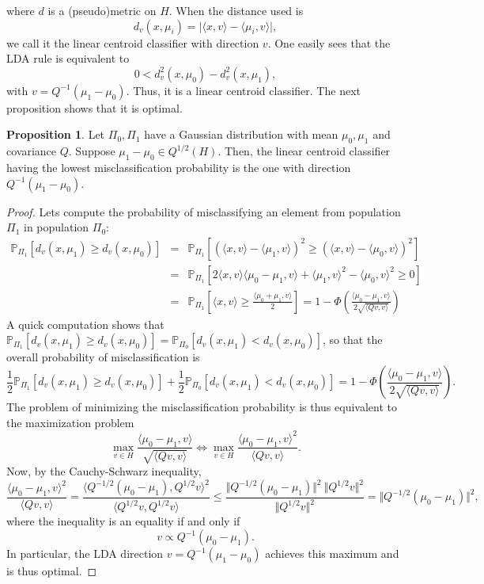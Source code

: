 \documentclass[10pt, a4paper]{report}
\newcommand{\Pp}[0]{\mathbb{P}}
\theoremstyle{definition}
\newtheorem{prop}{Proposition}
\theoremstyle{remark}
\begin{document}
where $d$ is a (pseudo)metric on $H$. When the distance used is 
$$d_v(x,\mu_i) = \vert \langle x,v \rangle - \langle \mu_i, v\rangle\vert,$$
we call it the linear centroid classifier with direction $v$. One easily sees that the LDA rule is equivalent to 
$$0 < d_v^2(x,\mu_0)-d_v^2(x,\mu_1),$$
with $v=Q^{-1}(\mu_1-\mu_0)$. Thus, it is a linear centroid classifier. The next proposition shows that it is optimal. 
\begin{prop}
	Let $\Pi_0,\Pi_1$ have a Gaussian distribution with mean $\mu_0,\mu_1$ and covariance $Q$. Suppose $\mu_1-\mu_0 \in Q^{1/2}(H)$. Then, the linear centroid classifier having the lowest misclassification probability is the one with direction $Q^{-1}(\mu_1-\mu_0)$.
	\begin{proof}
		Lets compute the probability of misclassifying an element from population $\Pi_1$ in population $\Pi_0$:
		\begin{eqnarray*}
			\Pp_{\Pi_1}\left[d_v(x,\mu_1)\geq d_v(x,\mu_0)\right] & = & \Pp_{\Pi_1}\left[\left(\langle x,v\rangle- \langle \mu_1,v\rangle\right)^2\geq \left(\langle x,v\rangle- \langle \mu_0,v\rangle\right)^2\right] \\
			& = & \Pp_{\Pi_1}\left[2\langle x,v \rangle\langle \mu_0-\mu_1,v \rangle + \langle \mu_1,v \rangle^2 - \langle \mu_0,v \rangle^2 \geq 0 \right] \\
			& = & \Pp_{\Pi_1}\left[ \langle x, v \rangle \geq \frac{\langle \mu_0 + \mu_1, v \rangle}{2}  \right] = 1 - \Phi\left(\frac{\langle\mu_0-\mu_1,v\rangle}{2\sqrt{\langle Qv,v\rangle}}\right)
		\end{eqnarray*}
		A quick computation shows that $\Pp_{\Pi_1}\left[d_v(x,\mu_1)\geq d_v(x,\mu_0)\right] = \Pp_{\Pi_0}\left[d_v(x,\mu_1) < d_v(x,\mu_0)\right]$, so that the overall probability of misclassification is 
		\begin{equation}\label{probmisclass}
			\frac{1}{2}  \Pp_{\Pi_1}\left[d_v(x,\mu_1)\geq d_v(x,\mu_0)\right] + \frac{1}{2}\Pp_{\Pi_0}\left[d_v(x,\mu_1) < d_v(x,\mu_0)\right] = 1 - \Phi\left(\frac{\langle\mu_0-\mu_1,v\rangle}{2\sqrt{\langle Qv,v\rangle}}\right).
		\end{equation}
		The problem of minimizing the misclassification probability is thus equivalent to the maximization problem
		$$ \max_{v\in H} \frac{\langle\mu_0-\mu_1,v\rangle}{\sqrt{\langle Qv,v\rangle}} \iff \max_{v\in H} \frac{\langle\mu_0-\mu_1,v\rangle^2}{\langle Qv,v\rangle}.$$
		Now, by the Cauchy-Schwarz inequality, 
		$$ \frac{\langle\mu_0-\mu_1,v\rangle^2}{\langle Qv,v\rangle} = \frac{\langle Q^{-1/2}(\mu_0-\mu_1),Q^{1/2}v\rangle^2}{\langle Q^{1/2}v,Q^{1/2}v\rangle} \leq \frac{\Vert Q^{-1/2}(\mu_0-\mu_1)\Vert^2 \ \Vert Q^{1/2}v\Vert^2 }{\Vert Q^{1/2}v\Vert^2} = \Vert Q^{-1/2}(\mu_0-\mu_1)\Vert^2,$$
		where the inequality is an equality if and only if 
		$$ v \propto Q^{-1}(\mu_0-\mu_1).$$
		In particular, the LDA direction $v=Q^{-1}(\mu_1-\mu_0)$ achieves this maximum and is thus optimal.
	\end{proof}
\end{prop}
\end{document}
